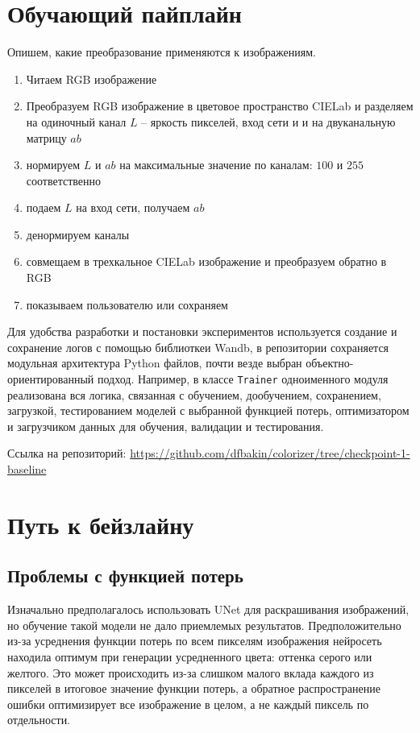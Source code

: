\documentclass[14pt]{article}
\begin{document}
\section{Обучающий пайплайн}
Опишем, какие преобразование применяются к изображениям.
\begin{enumerate}
    \item Читаем RGB изображение
    \item Преобразуем RGB изображение в цветовое пространство CIELab и разделяем на одиночный канал $L$ -- яркость пикселей, вход сети и
        и на двуканальную матрицу $ab$
    \item нормируем $L$ и $ab$ на максимальные значение по каналам: $100$ и $255$ соответственно
    \item подаем $L$ на вход сети, получаем $ab$
    \item денормируем каналы
    \item совмещаем в трехкальное CIELab изображение и преобразуем обратно в RGB
    \item показываем пользователю или сохраняем
\end{enumerate}

Для удобства разработки и постановки экспериментов используется создание и сохранение логов с помощью библиоткеи Wandb,
в репозитории сохраняется модульная архитектура Python файлов, почти везде выбран объектно-ориентированный подход. Например,
в классе \texttt{Trainer} одноименного модуля реализована вся логика, связанная с обучением, дообучением, сохранением, загрузкой, тестированием моделей
с выбранной функцией потерь, оптимизатором и загрузчиком данных для обучения, валидации и тестирования.

Ссылка на репозиторий: \url{https://github.com/dfbakin/colorizer/tree/checkpoint-1-baseline}



\section{Путь к бейзлайну}
\subsection{Проблемы с функцией потерь}

Изначально предполагалось использовать UNet для раскрашивания изображений, но обучение такой модели
не дало приемлемых результатов. Предположительно из-за усреднения функции потерь по всем пикселям изображения
нейросеть находила оптимум при генерации усредненного цвета: оттенка серого или желтого. Это может происходить
из-за слишком малого вклада каждого из пикселей в итоговое значение функции потерь, а
обратное распространение ошибки оптимизирует все изображение в целом, а не каждый пиксель по отдельности.
\end{document}
